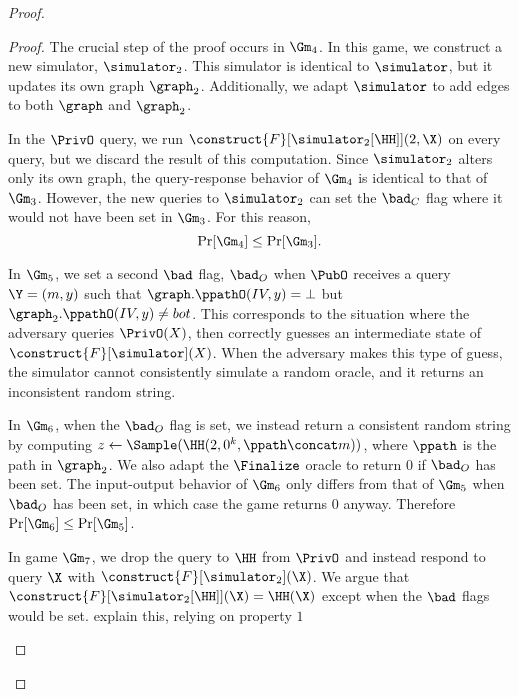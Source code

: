 \begin{proof}
\begin{proof}
		
		The crucial step of the proof occurs in $\Gm_4$. In this game, we construct a new simulator, $\simulator_2$. This simulator is identical to $\simulator$, but it updates its own graph $\graph_2$. Additionally, we adapt $\simulator$ to add edges to both $\graph$ and $\graph_2$. 
		
		In the $\PrivO$ query, we run $\construct{F}[\simulator_2[\HH]](2,\X)$ on every query, but we discard the result of this computation. Since $\simulator_2$ alters only its own graph, the query-response behavior of $\Gm_4$ is identical to that of $\Gm_3$. However, the new queries to $\simulator_2$ can set the $\bad_C$ flag where it would not have been set in $\Gm_3$. For this reason, 
		\[ \Pr[\Gm_4] \leq \Pr[\Gm_3].\]
		
		In $\Gm_5$, we set a second $\bad$ flag, $\bad_O$ when $\PubO$ receives a query $\Y = (m, y)$ such that $\graph.\ppathO(IV, y) = \bot$ but $\graph_2.\ppathO(IV, y) \neq bot$. This corresponds to the situation where the adversary queries $\PrivO(X)$, then correctly guesses an intermediate state of $\construct{F}[\simulator](X)$. When the adversary makes this type of guess, the simulator cannot consistently simulate a random oracle, and it returns an inconsistent random string.
	
		In $\Gm_6$, when the $\bad_O$ flag is set, we instead return a consistent random string by computing $z \gets \Sample(\HH(2, 0^k, \ppath\concat m))$, where $\ppath$ is the path in $\graph_2$. We also adapt the $\Finalize$ oracle to return $0$ if $\bad_O$ has been set. The input-output behavior of $\Gm_6$ only differs from that of $\Gm_5$ when $\bad_O$ has been set, in which case the game returns $0$ anyway. Therefore $\Pr[\Gm_6] \leq \Pr[\Gm_5]$. 
		
		In game $\Gm_7$, we drop the query to $\HH$ from $\PrivO$ and instead respond to query $\X$ with $\construct{F}[\simulator_2](\X)$. We argue that $\construct{F}[\simulator_2[\HH]](\X) = \HH(\X)$ except when the $\bad$ flags would be set. {\color{red} explain this, relying on property $1$}
		 
%		
\begin{figure}
\end{figure}
\end{proof}
\end{proof}
